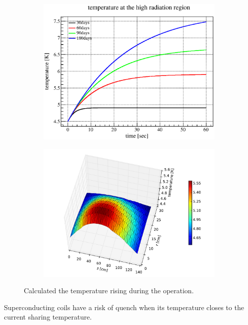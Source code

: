  \begin{figure}[H]
   \begin{subfigure}{0.3\textwidth}
    \centering
	\includegraphics[scale=0.42]{chapter5/fig/time.eps}
   \end{subfigure}
   \hspace{0.2\textwidth}
   \begin{subfigure}{0.3\textwidth}
    \centering
	\includegraphics[scale=0.42]{chapter5/fig/heatdis.pdf}
   \end{subfigure}
   \caption{Calculated the temperature rising during the operation.}
   \label{4heatdis}
  \end{figure}
Superconducting coils have a risk of quench when its temperature closes to the current sharing temperature.

